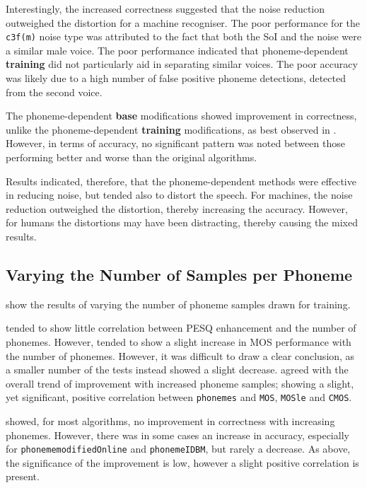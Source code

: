 Interestingly, the increased correctness suggested that the noise
reduction outweighed the distortion for a machine recogniser. The
poor performance for the \lstinline!c3f(m)! noise type was attributed
to the fact that both the \ac{SoI} and the noise were a similar male
voice. The poor performance indicated that phoneme-dependent \textbf{training}
did not particularly aid in separating similar voices. The poor accuracy
was likely due to a high number of false positive phoneme detections,
detected from the second voice.

The phoneme-dependent \textbf{base} modifications showed improvement
in correctness, unlike the phoneme-dependent \textbf{training} modifications,
as best observed in . However, in
terms of accuracy, no significant pattern was noted between those
performing better and worse than the original algorithms.

Results indicated, therefore, that the phoneme-dependent methods were
effective in reducing noise, but tended also to distort the speech.
For machines, the noise reduction outweighed the distortion, thereby
increasing the accuracy. However, for humans the distortions may have
been distracting, thereby causing the mixed results.


\subsection{\label{sub:Varying-Phns}Varying the Number of Samples per Phoneme}

show the results of varying the number of phoneme samples drawn for
training.

 tended to show little correlation between
\ac{PESQ} enhancement and the number of phonemes. However, 
tended to show a slight increase in \ac{MOS} performance with the
number of phonemes. However, it was difficult to draw a clear conclusion,
as a smaller number of the tests instead showed a slight decrease.
 agreed with the overall trend of improvement with
increased phoneme samples; showing a slight, yet significant, positive
correlation between \lstinline!phonemes! and \lstinline!MOS!, \lstinline!MOSle!
and \lstinline!CMOS!.

 showed,
for most algorithms, no improvement in correctness with increasing
phonemes. However, there was in some cases an increase in accuracy,
especially for \lstinline!phonememodifiedOnline! and \lstinline!phonemeIDBM!,
but rarely a decrease. As above, the significance of the improvement
is low, however a slight positive correlation is present.

